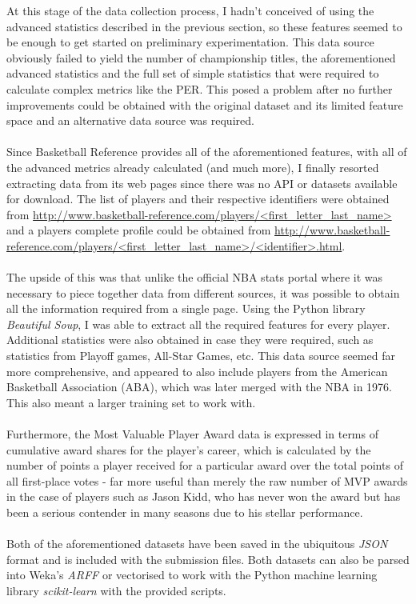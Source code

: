 \documentclass[paper=a4, fontsize=11pt]{scrartcl} %
\numberwithin{equation}{section} %
\numberwithin{figure}{section} %
\numberwithin{table}{section} %
\begin{document}
At this stage of the data collection process, I hadn't conceived of using the advanced statistics described in the previous section, so these features seemed to be enough to get started on preliminary experimentation. This data source obviously failed to yield the number of championship titles, the aforementioned advanced statistics and the full set of simple statistics that were required to calculate complex metrics like the PER. This posed a problem after no further improvements could be obtained with the original dataset and its limited feature space and an alternative data source was required.\\
\\
Since Basketball Reference provides all of the aforementioned features, with all of the advanced metrics already calculated (and much more), I finally resorted extracting data from its web pages since there was no API or datasets available for download. The list of players and their respective identifiers were obtained from \url{http://www.basketball-reference.com/players/<first_letter_last_name>} and a players complete profile could be obtained from \url{http://www.basketball-reference.com/players/<first_letter_last_name>/<identifier>.html}.\\
\\
The upside of this was that unlike the official NBA stats portal where it was necessary to piece together data from different sources, it was possible to obtain all the information required from a single page. Using the Python library \textit{Beautiful Soup}, I was able to extract all the required features for every player. Additional statistics were also obtained in case they were required, such as statistics from Playoff games, All-Star Games, etc. This data source seemed far more comprehensive, and appeared to also include players from the American Basketball Association (ABA), which was later merged with the NBA in 1976. This also meant a larger training set to work with.\\
\\
Furthermore, the Most Valuable Player Award data is expressed in terms of cumulative award shares for the player's career, which is calculated by the number of points a player received for a particular award over the total points of all first-place votes\cite{mvp} - far more useful than merely the raw number of MVP awards in the case of players such as Jason Kidd, who has never won the award but has been a serious contender in many seasons due to his stellar performance.\\
\\
Both of the aforementioned datasets have been saved in the ubiquitous \textit{JSON} format and is included with the submission files. Both datasets can also be parsed into Weka's \textit{ARFF} or vectorised to work with the Python machine learning library \textit{scikit-learn} with the provided scripts.
\end{document}
